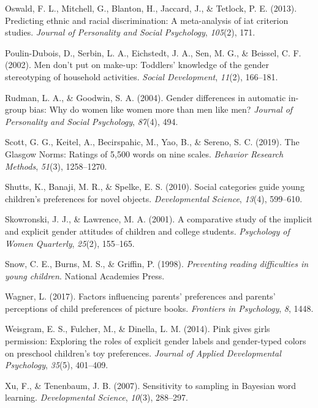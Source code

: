 \documentclass[
  english,
  ,man,floatsintext]{apa6}
\begin{document}
\leavevmode\hypertarget{ref-oswald2013predicting}{}%
Oswald, F. L., Mitchell, G., Blanton, H., Jaccard, J., \& Tetlock, P. E. (2013). Predicting ethnic and racial discrimination: A meta-analysis of iat criterion studies. \emph{Journal of Personality and Social Psychology}, \emph{105}(2), 171.

\leavevmode\hypertarget{ref-poulin2002men}{}%
Poulin-Dubois, D., Serbin, L. A., Eichstedt, J. A., Sen, M. G., \& Beissel, C. F. (2002). Men don't put on make-up: Toddlers' knowledge of the gender stereotyping of household activities. \emph{Social Development}, \emph{11}(2), 166--181.

\leavevmode\hypertarget{ref-rudman2004gender}{}%
Rudman, L. A., \& Goodwin, S. A. (2004). Gender differences in automatic in-group bias: Why do women like women more than men like men? \emph{Journal of Personality and Social Psychology}, \emph{87}(4), 494.

\leavevmode\hypertarget{ref-scott2019glasgow}{}%
Scott, G. G., Keitel, A., Becirspahic, M., Yao, B., \& Sereno, S. C. (2019). The Glasgow Norms: Ratings of 5,500 words on nine scales. \emph{Behavior Research Methods}, \emph{51}(3), 1258--1270.

\leavevmode\hypertarget{ref-shutts2010social}{}%
Shutts, K., Banaji, M. R., \& Spelke, E. S. (2010). Social categories guide young children's preferences for novel objects. \emph{Developmental Science}, \emph{13}(4), 599--610.

\leavevmode\hypertarget{ref-skowronski2001comparative}{}%
Skowronski, J. J., \& Lawrence, M. A. (2001). A comparative study of the implicit and explicit gender attitudes of children and college students. \emph{Psychology of Women Quarterly}, \emph{25}(2), 155--165.

\leavevmode\hypertarget{ref-snow1998preventing}{}%
Snow, C. E., Burns, M. S., \& Griffin, P. (1998). \emph{Preventing reading difficulties in young children}. National Academies Press.

\leavevmode\hypertarget{ref-wagner2017factors}{}%
Wagner, L. (2017). Factors influencing parents' preferences and parents' perceptions of child preferences of picture books. \emph{Frontiers in Psychology}, \emph{8}, 1448.

\leavevmode\hypertarget{ref-weisgram2014pink}{}%
Weisgram, E. S., Fulcher, M., \& Dinella, L. M. (2014). Pink gives girls permission: Exploring the roles of explicit gender labels and gender-typed colors on preschool children's toy preferences. \emph{Journal of Applied Developmental Psychology}, \emph{35}(5), 401--409.

\leavevmode\hypertarget{ref-xu2007b}{}%
Xu, F., \& Tenenbaum, J. B. (2007). Sensitivity to sampling in Bayesian word learning. \emph{Developmental Science}, \emph{10}(3), 288--297.
\end{document}
